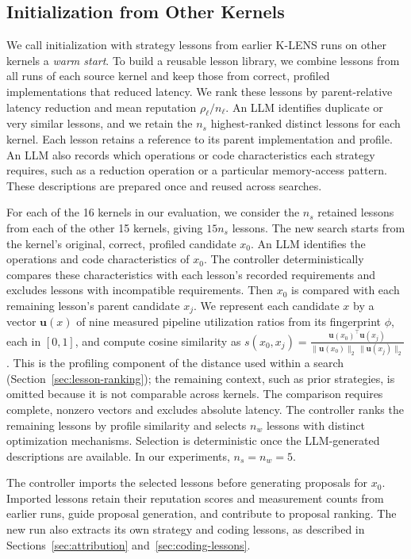 \documentclass[acmsmall,screen,review,anonymous,nonacm]{acmart}
\newcommand{\klens}{\textsc{K-LENS}\xspace}
\begin{document}
\subsection{Initialization from Other Kernels}
\label{sec:transfer}

We call initialization with strategy lessons from earlier \klens runs on other
kernels a \emph{warm start}. To build a reusable lesson library, we combine
lessons from all runs of each source kernel and keep those from correct,
profiled implementations that reduced latency.
We rank these lessons by parent-relative latency reduction and mean reputation
$\rho_\ell/n_\ell$.
An LLM identifies duplicate or very similar lessons, and we retain the $n_s$
highest-ranked distinct lessons for each kernel. Each lesson retains a reference
to its parent implementation and profile. An LLM
also records which operations or code characteristics each strategy requires,
such as a reduction operation or a particular memory-access pattern. These
descriptions are prepared once and reused across searches.

For each of the 16 kernels in our evaluation, we consider the $n_s$ retained
lessons from each of the other 15 kernels, giving $15n_s$ lessons. The new
search starts from the kernel's original, correct, profiled candidate $x_0$.
An LLM identifies the operations and code characteristics of $x_0$.
The controller deterministically compares these characteristics with each
lesson's recorded requirements and excludes lessons with incompatible
requirements. Then $x_0$ is compared with each remaining lesson's parent candidate $x_j$.
We represent each candidate $x$ by a vector
$\mathbf{u}(x)$ of nine measured pipeline utilization ratios from its fingerprint $\phi$, each in $[0,1]$,
and compute cosine similarity as $s(x_0,x_j)=
\frac{\mathbf{u}(x_0)^\top\mathbf{u}(x_j)}
{\lVert\mathbf{u}(x_0)\rVert_2\,\lVert\mathbf{u}(x_j)\rVert_2}$.
This is the profiling component of the distance used within a search
(Section~\ref{sec:lesson-ranking}); the remaining context, such as prior
strategies, is omitted because it is not comparable across kernels.
The comparison requires complete, nonzero vectors and excludes absolute latency.
The controller ranks the remaining lessons by profile similarity and selects
$n_w$ lessons with distinct optimization mechanisms. Selection is deterministic once the LLM-generated
descriptions are available. In our experiments, $n_s=n_w=5$.

The controller imports the selected lessons before generating proposals for
$x_0$. Imported lessons retain their reputation scores and measurement counts from
earlier runs, guide proposal generation, and contribute to proposal ranking.
The new run also extracts its own strategy and coding lessons, as described in
Sections~\ref{sec:attribution} and~\ref{sec:coding-lessons}.
\end{document}
